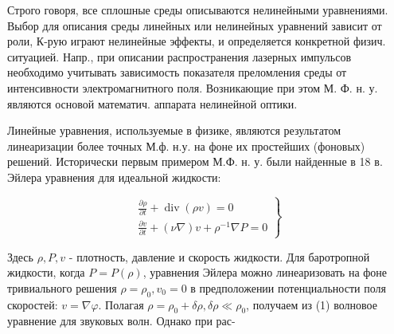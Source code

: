 \documentclass[10pt]{article}
\begin{document}
Строго говоря, все сплошные среды описываются нелинейными уравнениями. Выбор для описания среды линейных или нелинейных уравнений зависит от роли, К-рую играют нелинейные эффекты, и определяется конкретной физич. ситуацией. Напр., при описании распространения лазерных импульсов необходимо учитывать зависимость показателя преломления среды от интенсивности электромагнитного поля. Возникающие при этом М. Ф. н. у. являются основой математич. аппарата нелинейной оптики.



Линейные уравнения, используемые в физике, являются результатом линеаризации более точных М.ф. н.у. на фоне их простейших (фоновых) решений. Исторически первым примером М.Ф. н. у. были найденные в 18 в. Эйлера уравнения для идеальной жидкости:



\[

\left.\begin{array}{c}

\frac{\partial \rho}{\partial t}+\operatorname{div}(\rho v)=0 \\

\frac{\partial v}{\partial t}+(\nu \nabla) v+\rho^{-1} \nabla P=0

\end{array}\right\}

\]



Здесь $\rho, P, v$ - плотность, давление и скорость жидкости. Для баротропной жидкости, когда $P=P(\rho)$, уравнения Эйлера можно линеаризовать на фоне тривиального решения $\rho=\rho_{0}, v_{0}=0$ в предположении потенциальности поля скоростей: $v=\nabla \varphi$. Полагая $\rho=\rho_{0}+\delta \rho, \delta \rho \ll \rho_{0}$, получаем из (1) волновое уравнение для звуковых волн. Однако при рас-
\end{document}
